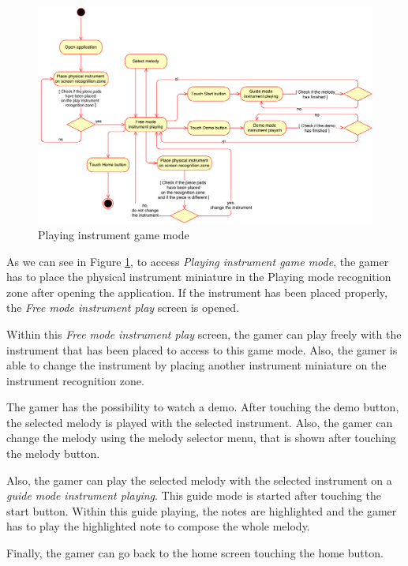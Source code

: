 \begin{figure}[ht!]
	\centering
	\includegraphics[width=400pt]{graphics/PlayingGameMode.pdf}
	\caption{Playing instrument game mode}
	\label{fig:playingworkflow}
\end{figure}

As we can see in Figure \ref{fig:playingworkflow}, to access \textit{Playing instrument game mode}, the gamer has to place the physical instrument miniature in the Playing mode recognition zone after opening the application. If the instrument has been placed properly, the \textit{Free mode instrument play} screen is opened.

Within this \textit{Free mode instrument play} screen, the gamer can play freely with the instrument that has been placed to access to this game mode. Also, the gamer is able to change the instrument by placing another instrument miniature on the instrument recognition zone.

The gamer has the possibility to watch a demo. After touching the demo button, the selected melody is played with the selected instrument. Also, the gamer can change the melody using the melody selector menu, that is shown after touching the melody button.

Also, the gamer can play the selected melody with the selected instrument on a \textit{guide mode instrument playing}. This guide mode is started after touching the start button. Within this guide playing, the notes are highlighted and the gamer has to play the highlighted note to compose the whole melody.

Finally, the gamer can go back to the home screen touching the home button.

\FloatBarrier

